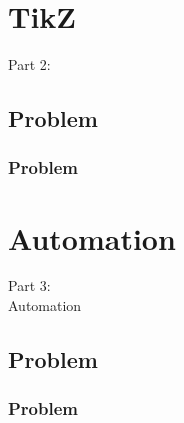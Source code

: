 {
\renewcommand{\bgcolor}{tikz}

\section{TikZ}
\begin{frame}
  \vspace{25mm}
  \begin{center}
    \Huge{Part 2:\\\TikZ}
  \end{center}
\end{frame}

\subsection{Problem}
\begin{frame}[fragile]
  \frametitle{Problem}
  \vspace{3mm}
  
\end{frame}

}


{
\renewcommand{\bgcolor}{auto}

\section{Automation}
\begin{frame}
  \vspace{25mm}
  \begin{center}
    \Huge{Part 3:\\Automation}
  \end{center}
\end{frame}

\subsection{Problem}
\begin{frame}[fragile]
  \frametitle{Problem}
  \vspace{3mm}
  
\end{frame}

}

